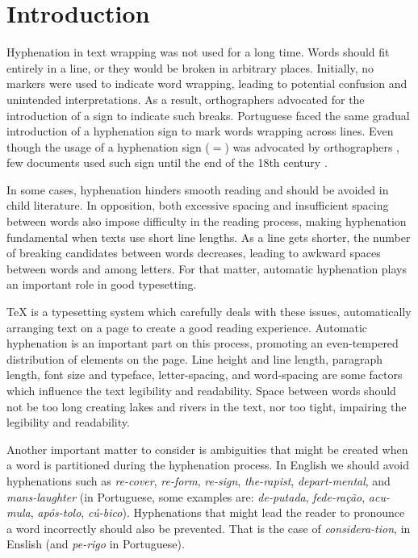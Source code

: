 \section{Introduction}\label{sec-intro}

Hyphenation in text wrapping was not used for a long time. Words should fit
entirely in a line, or they would be broken in arbitrary places.  Initially, no
markers were used to indicate word wrapping, leading to potential confusion and
unintended interpretations. As a result, orthographers advocated for the
introduction of a sign to indicate such breaks. Portuguese faced the same
gradual introduction of a hyphenation sign to mark words wrapping across lines.
Even though the usage of a hyphenation sign ($=$) was advocated by
orthographers \parencite{gandavo1574}, few documents used such sign until the end of
the 18th century \parencite{araujo2015}.

In some cases, hyphenation hinders smooth reading and should be avoided in
child literature. In opposition, both excessive spacing and insufficient
spacing between words also impose difficulty in the reading process, making
hyphenation fundamental when texts use short line lengths. As a line gets
shorter, the number of breaking candidates between words decreases, leading to
awkward spaces between words and among letters. For that matter, automatic
hyphenation plays an important role in good typesetting.


\TeX{} is a typesetting system which carefully deals with these issues,
automatically arranging text on a page to create a good reading experience.
Automatic hyphenation is an important part on this process,
promoting an even-tempered distribution of elements on the page.
Line height and line length, paragraph length, font size and typeface,
letter-spacing, and word-spacing are some factors which influence the text legibility
and readability. Space between words should not be too long creating lakes and
rivers in the text, nor too tight, impairing the legibility and readability.

Another important matter to consider is ambiguities that might be created when
a word is partitioned during the hyphenation process. In English we should
avoid hyphenations such as \emph{re-cover}, \emph{re-form}, \emph{re-sign}, \emph{the-rapist},
\emph{depart-mental}, and \emph{mans-laughter} (in Portuguese, some examples are:
\emph{de-putada}, \emph{fede-ração}, \emph{acu-mula}, \emph{após-tolo},
\emph{cú-bico}). Hyphenations that might lead the reader to pronounce a word
incorrectly should also be prevented. That is the case of
\emph{considera-tion}, in Enslish (and \emph{pe-rigo} in Portuguese).

